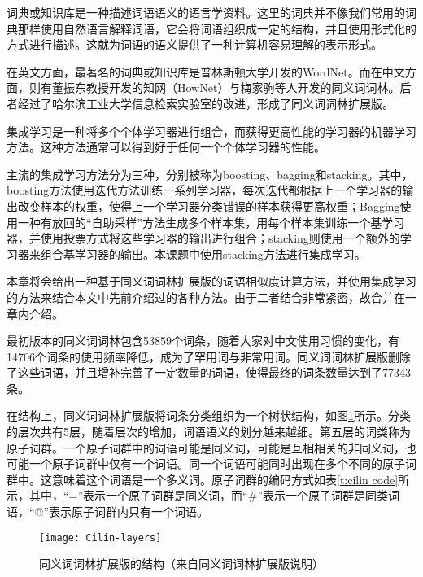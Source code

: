
\label{c:ensemble}
词典或知识库是一种描述词语语义的语言学资料。这里的词典并不像我们常用的词典那样使用自然语言解释词语，它会将词语组织成一定的结构，并且使用形式化的方式进行描述。这就为词语的语义提供了一种计算机容易理解的表示形式。

在英文方面，最著名的词典或知识库是普林斯顿大学开发的WordNet。而在中文方面，则有董振东教授开发的知网（HowNet）与梅家驹等人开发的同义词词林。后者经过了哈尔滨工业大学信息检索实验室的改进，形成了同义词词林扩展版。

集成学习是一种将多个个体学习器进行组合，而获得更高性能的学习器的机器学习方法。这种方法通常可以得到好于任何一个个体学习器的性能。

主流的集成学习方法分为三种，分别被称为boosting、bagging和stacking。其中，boosting方法使用迭代方法训练一系列学习器，每次迭代都根据上一个学习器的输出改变样本的权重，使得上一个学习器分类错误的样本获得更高权重；Bagging使用一种有放回的“自助采样”方法生成多个样本集，用每个样本集训练一个基学习器，并使用投票方式将这些学习器的输出进行组合；stacking则使用一个额外的学习器来组合基学习器的输出。本课题中使用stacking方法进行集成学习。

本章将会给出一种基于同义词词林扩展版的词语相似度计算方法，并使用集成学习的方法来结合本文中先前介绍过的各种方法。由于二者结合非常紧密，故合并在一章内介绍。

最初版本的同义词词林包含53859个词条，随着大家对中文使用习惯的变化，有14706个词条的使用频率降低，成为了罕用词与非常用词。同义词词林扩展版删除了这些词语，并且增补完善了一定数量的词语，使得最终的词条数量达到了77343条。

在结构上，同义词词林扩展版将词条分类组织为一个树状结构，如图\ref{f:cilin layers}所示。分类的层次共有5层，随着层次的增加，词语语义的划分越来越细。第五层的词类称为原子词群。一个原子词群中的词语可能是同义词，可能是互相相关的非同义词，也可能一个原子词群中仅有一个词语。同一个词语可能同时出现在多个不同的原子词群中。这意味着这个词语是一个多义词。原子词群的编码方式如表\ref{t:cilin code}所示，其中，“=”表示一个原子词群是同义词，而“\#”表示一个原子词群是同类词语，“@”表示原子词群内只有一个词语。

\begin{figure}[h]
	\centering
	\texttt{[image: Cilin-layers]}
	\caption{同义词词林扩展版的结构（来自同义词词林扩展版说明）}
	\label{f:cilin layers}
	\vspace{-1em}
\end{figure}

